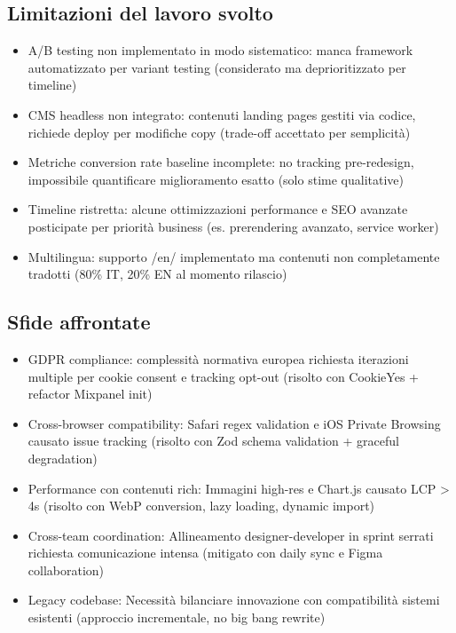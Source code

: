 \subsection{Limitazioni del lavoro svolto}
\begin{itemize}
  \item A/B testing non implementato in modo sistematico: manca 
        framework automatizzato per variant testing (considerato ma 
        deprioritizzato per timeline)
  \item CMS headless non integrato: contenuti landing pages gestiti via 
        codice, richiede deploy per modifiche copy (trade-off 
        accettato per semplicità)
  \item Metriche conversion rate baseline incomplete: no tracking 
        pre-redesign, impossibile quantificare miglioramento esatto 
        (solo stime qualitative)
  \item Timeline ristretta: alcune ottimizzazioni performance e SEO 
        avanzate posticipate per priorità business (es. prerendering 
        avanzato, service worker)
  \item Multilingua: supporto /en/ implementato ma contenuti non 
        completamente tradotti (80\% IT, 20\% EN al momento rilascio)
\end{itemize}

\subsection{Sfide affrontate}
\begin{itemize}
  \item GDPR compliance: complessità normativa europea richiesta 
        iterazioni multiple per cookie consent e tracking opt-out 
        (risolto con CookieYes + refactor Mixpanel init)
  \item Cross-browser compatibility: Safari regex validation e iOS 
        Private Browsing causato issue tracking (risolto con Zod 
        schema validation + graceful degradation)
  \item Performance con contenuti rich: Immagini high-res e Chart.js 
        causato LCP > 4s (risolto con WebP conversion, lazy loading, 
        dynamic import)
  \item Cross-team coordination: Allineamento designer-developer in 
        sprint serrati richiesta comunicazione intensa (mitigato con 
        daily sync e Figma collaboration)
  \item Legacy codebase: Necessità bilanciare innovazione con 
        compatibilità sistemi esistenti (approccio incrementale, no 
        big bang rewrite)
\end{itemize}

